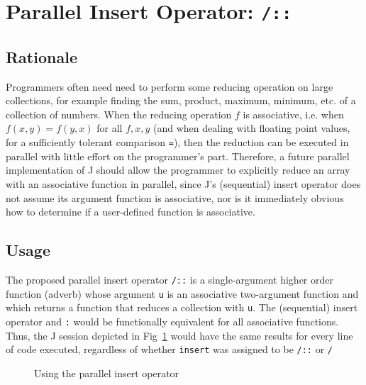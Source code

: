 \pagebreak

\section{Parallel Insert Operator: \texttt{/::}}
\label{pins}
\subsection{Rationale}
Programmers often need need to perform some reducing operation on large collections, 
for example finding the sum, product, maximum, minimum, etc. of a collection of numbers.
When the reducing operation $f$ is associative, 
i.e. when $f(x,y) = f(y,x)$ for all $f, x, y$ 
(and when dealing with floating point values, for a sufficiently tolerant comparison \texttt{=}),
then the reduction can be executed in parallel with little effort on the programmer's part.
Therefore, a future parallel implementation of J should allow the programmer 
to explicitly reduce an array with an associative function in parallel, 
since J's (sequential) insert operator does not assume its argument function is associative, 
nor is it immediately obvious how to determine if a user-defined function is associative.

\subsection{Usage}
The proposed parallel insert operator \texttt{/::} is a single-argument higher order function (adverb) 
whose argument \texttt{u} is an associative two-argument function 
and which returns a function that reduces a collection with \texttt{u}.
The (sequential) insert operator and \texttt{\::} would be 
functionally equivalent for all associative functions.
Thus, the J session depicted in Fig~\ref{fig::pinsert} would have the same results for every line of code executed, 
regardless of whether \texttt{insert} was assigned to be \texttt{/::} or \texttt{/}


\begin{figure}[h]
\begin{quote}
\begin{singlespacing}
\begin{small}
\end{small}
\end{singlespacing}
\end{quote}
\caption{Using the parallel insert operator}
\label{fig::pinsert}
\end{figure}

